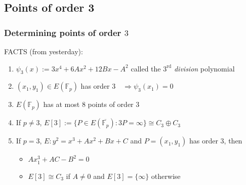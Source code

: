 \documentclass[handout]{beamer}%
\newcommand{\F}{\mathbb F}
\theoremstyle{definition}
\begin{document}
\subsection{Points of order 3}
% 
% 
% 
% 
% 
% 

\begin{frame}\frametitle{Determining points of order $3$}
\begin{beamerboxesrounded}[upper=block title example,lower=block body alerted,shadow=true]{FACTS (from yesterday):}
\begin{enumerate}[<+-| alert@+>]
 \item $\psi_3(x):= 3x^4+6Ax^2+12Bx-A^2$ called the $3^{\text{rd}}$ \emph{division} polynomial
 \item $(x_1,y_1)\in E(\F_p)$ has order $3\quad \Rightarrow \psi_3(x_1)=0$
 \item $E(\F_p)$ has at most $8$ points of order $3$
 \item If $p\neq 3$, $E[3]:=\{P\in E(\overline{\F_p}): 3P=\infty\}\cong C_3\oplus C_3$
 \item If $p=3$, $E: y^2=x^3+Ax^2+Bx+C$ and $P=(x_1,y_1)$
has order $3$, then
\begin{itemize}[<+-| alert@+>]
 \item $Ax_1^3+AC-B^2=0$
 \item $E[3]\cong C_3$ if $A\neq0$ and $E[3]=\{\infty\}$ otherwise
 \end{itemize}
\end{enumerate}
 \end{beamerboxesrounded}
\end{frame}
\end{document}
